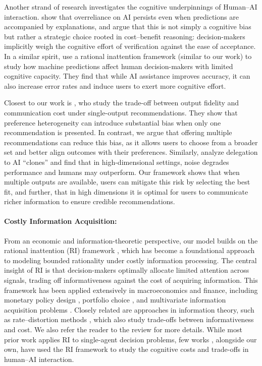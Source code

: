 \documentclass[12pt]{article}
\theoremstyle{definition}
\theoremstyle{remark}
\begin{document}
Another strand of research investigates the cognitive underpinnings of Human–AI interaction. \citet{vasconcelos2023explanations} show that overreliance on AI persists even when predictions are accompanied by explanations, and argue that this is not simply a cognitive bias but rather a strategic choice rooted in cost–benefit reasoning: decision-makers implicitly weigh the cognitive effort of verification against the ease of acceptance. In a similar spirit, \citet{boyaci2024human} use a rational inattention framework (similar to our work) to study how machine predictions affect human decision-makers with limited cognitive capacity. They find that while AI assistance improves accuracy, it can also increase error rates and induce users to exert more cognitive effort.

Closest to our work is \citet{castro2023human}, who study the trade-off between output fidelity and communication cost under single-output recommendations. They show that preference heterogeneity can introduce substantial bias when only one recommendation is presented. In contrast, we argue that offering multiple recommendations can reduce this bias, as it allows users to choose from a broader set and better align outcomes with their preferences. Similarly, \citet{liang2025artificial} analyze delegation to AI “clones” and find that in high-dimensional settings, noise degrades performance and humans may outperform. Our framework shows that when multiple outputs are available, users can mitigate this risk by selecting the best fit, and further, that in high dimensions it is optimal for users to communicate richer information to ensure credible recommendations.

\paragraph{Costly Information Acquisition:} From an economic and information-theoretic perspective, our model builds on the rational inattention (RI) framework \citep{sims2003implications, sims2005rational}, which has become a foundational approach to modeling bounded rationality under costly information processing. The central insight of RI is that decision-makers optimally allocate limited attention across signals, trading off informativeness against the cost of acquiring information. This framework has been applied extensively in macroeconomics and finance, including monetary policy design \citep{sims2006rational, mackowiak2009optimal}, portfolio choice \citep{zhong2022optimal}, and multivariate information acquisition problems \citep{miao2022multivariate}. Closely related are approaches in information theory, such as rate–distortion methods \citep{tishby2010information}, which also study trade-offs between informativeness and cost. We also refer the reader to the review \citep{mackowiak2023rational} for more details. While most prior work applies RI to single-agent decision problems, few works \citep{castro2023human,boyaci2024human}, alongside our own, have used the RI framework to study the cognitive costs and trade-offs in human–AI interaction.
\end{document}
